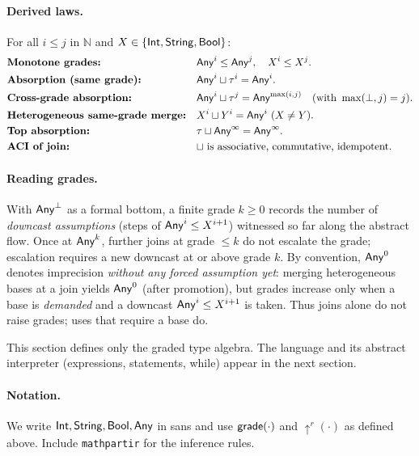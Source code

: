 \paragraph{Derived laws.}
For all $i\le j$ in $\mathbb{N}$ and $X\in\{\mathsf{Int},\mathsf{String},\mathsf{Bool}\}$:
\begin{align*}
&\textbf{Monotone grades:} && \mathsf{Any}^{i} \le \mathsf{Any}^{j},\quad X^{i} \le X^{j}.\\
&\textbf{Absorption (same grade):} && \mathsf{Any}^{i} \sqcup \tau^{i} = \mathsf{Any}^{i}.\\
&\textbf{Cross-grade absorption:} && \mathsf{Any}^{i} \sqcup \tau^{j} = \mathsf{Any}^{\max(i,j)}\quad(\text{with }\max(\bot,j)=j).\\
&\textbf{Heterogeneous same-grade merge:} && X^{i} \sqcup Y^{i}=\mathsf{Any}^{i}\ (X\neq Y).\\
&\textbf{Top absorption:} && \tau \sqcup \mathsf{Any}^{\infty}=\mathsf{Any}^{\infty}.\\
&\textbf{ACI of join:} && \text{$\sqcup$ is associative, commutative, idempotent.}
\end{align*}

\paragraph{Reading grades.}
With $\mathsf{Any}^{\bot}$ as a formal bottom, a finite grade $k\ge 0$ records the number of \emph{downcast assumptions} (steps of $\mathsf{Any}^{i}\le X^{i+1}$) witnessed so far along the abstract flow.
Once at $\mathsf{Any}^{k}$, further joins at grade $\le k$ do not escalate the grade; escalation requires a new downcast at or above grade $k$.
By convention, $\mathsf{Any}^{0}$ denotes imprecision \emph{without any forced assumption yet}:
merging heterogeneous bases at a join yields $\mathsf{Any}^{0}$ (after promotion), but grades increase only when a base is \emph{demanded} and a downcast $\mathsf{Any}^{i}\le X^{i+1}$ is taken.
Thus joins alone do not raise grades; uses that require a base do.

\medskip
This section defines only the graded type algebra.
The language and its abstract interpreter (expressions, statements, \textsf{while}) appear in the next section.

\paragraph*{Notation.}
We write $\mathsf{Int},\mathsf{String},\mathsf{Bool},\mathsf{Any}$ in \textsf{sans} and use
$\mathsf{grade}(\cdot)$ and $\uparrow^{r}(\cdot)$ as defined above.
Include \texttt{mathpartir} for the inference rules.
